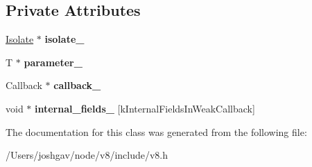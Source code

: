 \subsection*{Private Attributes}
\begin{DoxyCompactItemize}
\item 
\hyperlink{classv8_1_1_isolate}{Isolate} $\ast$ {\bfseries isolate\+\_\+}\hypertarget{classv8_1_1_weak_callback_info_ae50449492b57da9cd055f5f69c7ca336}{}\label{classv8_1_1_weak_callback_info_ae50449492b57da9cd055f5f69c7ca336}

\item 
T $\ast$ {\bfseries parameter\+\_\+}\hypertarget{classv8_1_1_weak_callback_info_a98c635b4de81a662986fac486407e895}{}\label{classv8_1_1_weak_callback_info_a98c635b4de81a662986fac486407e895}

\item 
Callback $\ast$ {\bfseries callback\+\_\+}\hypertarget{classv8_1_1_weak_callback_info_a68460dc23ab6c64334090665d1ddf366}{}\label{classv8_1_1_weak_callback_info_a68460dc23ab6c64334090665d1ddf366}

\item 
void $\ast$ {\bfseries internal\+\_\+fields\+\_\+} \mbox{[}k\+Internal\+Fields\+In\+Weak\+Callback\mbox{]}\hypertarget{classv8_1_1_weak_callback_info_a9f4de09bcd496ba8109eec7774395a8b}{}\label{classv8_1_1_weak_callback_info_a9f4de09bcd496ba8109eec7774395a8b}

\end{DoxyCompactItemize}


The documentation for this class was generated from the following file\+:\begin{DoxyCompactItemize}
\item 
/\+Users/joshgav/node/v8/include/v8.\+h\end{DoxyCompactItemize}
